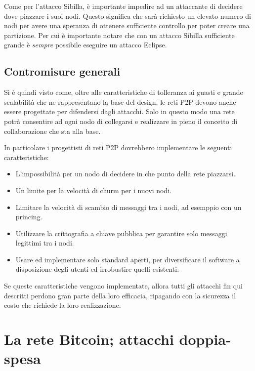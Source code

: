 Come per l'attacco Sibilla, è importante impedire ad un attaccante di decidere dove piazzare i suoi nodi. Questo significa che sarà richiesto un elevato numero di nodi per avere una speranza di ottenere sufficiente controllo per poter creare una partizione. Per cui è importante notare che con un attacco Sibilla sufficiente grande è \emph{sempre} possibile eseguire un attacco Eclipse.

\subsection{Contromisure generali}\label{contromisure-generali}

Si è quindi visto come, oltre alle caratteristiche di tolleranza ai guasti e grande scalabilità che ne rappresentano la base del design, le reti P2P devono anche essere progettate per difendersi dagli attacchi. Solo in questo modo una rete potrà consentire ad ogni nodo di collegarsi e realizzare in pieno il concetto di collaborazione che sta alla base.

In particolare i progettisti di reti P2P dovrebbero implementare le seguenti caratteristiche:

\begin{itemize}
\itemsep1pt\parskip0pt
\item
  L'impossibilità per un nodo di decidere in che punto della rete   piazzarsi.
\item
  Un limite per la velocità di churm per i nuovi nodi.
\item
  Limitare la velocità di scambio di messaggi tra i nodi, ad esemppio   con un princing.
\item
  Utilizzare la crittografia a chiave pubblica per garantire solo   messaggi legittimi tra i nodi.
\item
  Usare ed implementare solo standard aperti, per diversificare il   software a disposizione degli utenti ed irrobustire quelli esistenti.
\end{itemize}

Se queste caratteristiche vengono implementate, allora tutti gli attacchi fin qui descritti perdono gran parte della loro efficacia, ripagando con la sicurezza il costo che richiede la loro realizzazione.

\section{La rete Bitcoin; attacchi doppia-spesa}\label{la-rete-bitcoin}

